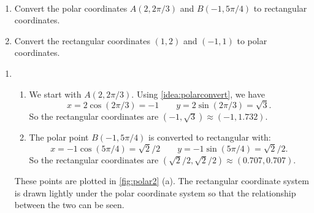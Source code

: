 \begin{example}\label{ex_polar2}%
\mbox{}\\[-2\baselineskip]\parbox[t]{\linewidth}{%
\begin{enumerate}
\item		Convert the polar coordinates $A(2,2\pi/3)$ and $B(-1,5\pi/4)$ to rectangular coordinates.
\item		Convert the rectangular coordinates $(1,2)$ and $(-1,1)$ to polar coordinates.
\end{enumerate}}
\solution
\begin{enumerate}
	\item \begin{enumerate}
		\item 
	We start with $A(2,2\pi/3)$. Using \autoref{idea:polarconvert}, we have 
	\[x= 2\cos (2\pi/3) = -1\qquad y = 2\sin (2\pi/3) = \sqrt{3}.\]
	So the rectangular coordinates are $(-1,\sqrt{3}) \approx (-1,1.732)$.
	
	\item The polar point $B(-1,5\pi/4)$ is converted to rectangular with:
	\[x=-1\cos (5\pi/4) = \sqrt{2}/2\qquad y= -1\sin (5\pi/4) = \sqrt{2}/2.\]
	So the rectangular coordinates are $(\sqrt{2}/2,\sqrt{2}/2) \approx (0.707,0.707)$.
	\end{enumerate}
	These points are plotted in \autoref{fig:polar2} (a). The rectangular coordinate system is drawn lightly under the polar coordinate system so that the relationship between the two can be seen.
	

\end{enumerate}
\end{example}
